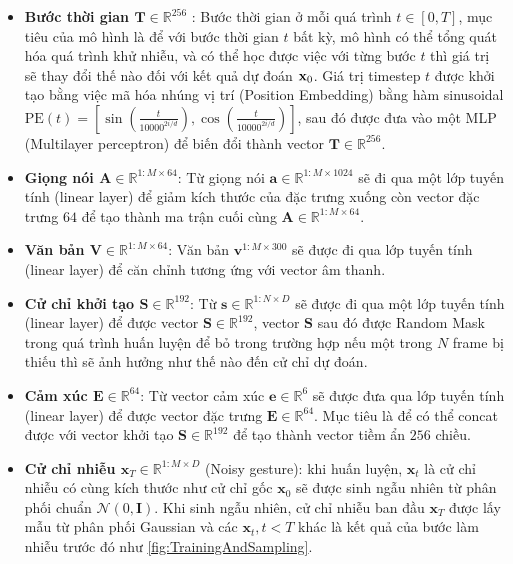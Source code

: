 \begin{itemize}
	\item \textbf{Bước thời gian $\mathbf{T} \in \mathbb{R}^{256}$ }: Bước thời gian ở mỗi quá trình $t \in [0, T]$, mục tiêu của mô hình là để với bước thời gian $t$ bất kỳ, mô hình có thể tổng quát hóa quá trình khử nhiễu, và có thể học được việc với từng bước $t$ thì giá trị sẽ thay đổi thế nào đối với kết quả dự đoán $\mathbf{x}_0$. Giá trị timestep $t$ được khởi tạo bằng việc mã hóa nhúng vị trí (Position Embedding) bằng hàm sinusoidal $\text{PE}(t) = \left[ \sin{\left(\frac{t}{10000^{2i / d}}\right)}, \cos{\left(\frac{t}{10000^{2i / d}}\right)} \right]$, sau đó được đưa vào một MLP (Multilayer perceptron) để biến đổi thành vector $\mathbf{T}  \in \mathbb{R}^{256}$.
	
	  \item \textbf{Giọng nói $\mathbf{A} \in \mathbb{R}^{1:M \times 64}$}: Từ giọng nói $\mathbf{a} \in \mathbb{R}^{1:M \times 1024}$ sẽ đi qua một lớp tuyến tính (linear layer) để giảm kích thước của đặc trưng xuống còn vector đặc trưng $64$ để tạo thành ma trận cuối cùng $\mathbf{A} \in \mathbb{R}^{1:M \times 64}$.
	  
	  \item \textbf{Văn bản $\mathbf{V} \in \mathbb{R}^{1:M \times 64}$}: Văn bản $\mathbf{v}^{1:M \times 300}$ sẽ được đi qua lớp tuyến tính (linear layer) để căn chỉnh tương ứng với vector âm thanh.
	
	\item \textbf{Cử chỉ khởi tạo $\mathbf{S} \in \mathbb{R}^{192}$}: Từ $\mathbf{s} \in \mathbb{R}^{1:N \times D}$ sẽ được đi qua một lớp tuyến tính (linear layer) để được vector $\mathbf{S} \in \mathbb{R}^{192}$, vector $\mathbf{S}$ sau đó được Random Mask trong quá trình huấn luyện để bỏ trong trường hợp nếu một trong $N$ frame bị thiếu thì sẽ ảnh hưởng như thế nào đến cử chỉ dự đoán.

  \item \textbf{Cảm xúc $\mathbf{E} \in \mathbb{R}^{64}$}: Từ vector cảm xúc $\mathbf{e} \in \mathbb{R}^{6}$ sẽ được đưa qua lớp tuyến tính (linear layer) để được vector đặc trưng $\mathbf{E} \in \mathbb{R}^{64}$. Mục tiêu là để có thể concat được với vector khởi tạo $\mathbf{S} \in \mathbb{R}^{192} $ để tạo thành vector tiềm ẩn $256$ chiều.
  
	\item \textbf{Cử chỉ nhiễu $\mathbf{x}_{T} \in \mathbb{R}^{1:M \times D}$} (Noisy gesture): khi huấn luyện, $\mathbf{x}_{t}$ là cử chỉ nhiễu có cùng kích thước như cử chỉ gốc $\mathbf{x}_{0}$ sẽ được sinh ngẫu nhiên từ phân phối chuẩn $\mathcal{N}(0, \mathbf{I})$. Khi sinh ngẫu nhiên, cử chỉ nhiễu ban đầu $\mathbf{x}_{T}$ được lấy mẫu từ phân phối Gaussian và các $\mathbf{x}_{t}, t<T$ khác là kết quả của bước làm nhiễu trước đó như \autoref{fig:TrainingAndSampling}.
\end{itemize}


